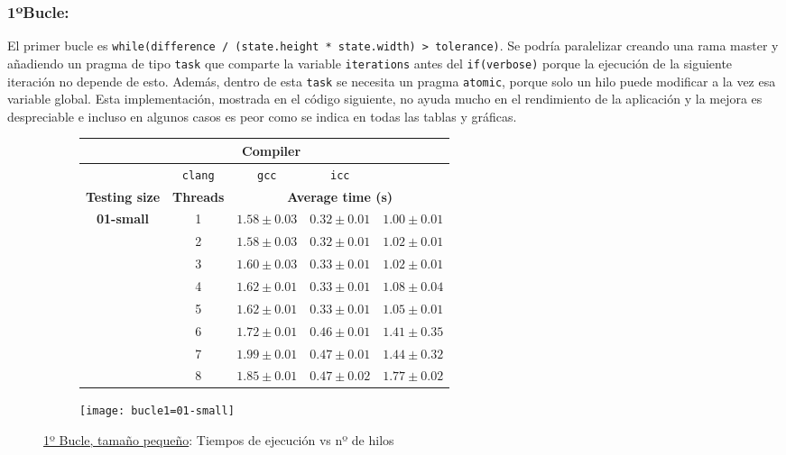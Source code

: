 
\subsubsection{\textbf{1ºBucle:}}
\par El primer bucle es \texttt{while(difference / (state.height * state.width) > tolerance)}. Se podría paralelizar creando una rama master y añadiendo un pragma de tipo
\texttt{task} que comparte la variable \texttt{iterations} antes del \texttt{if(verbose)} porque la ejecución de la siguiente iteración no depende de esto.
Además, dentro de esta \texttt{task} se necesita un pragma \texttt{atomic}, porque solo un hilo puede modificar a la vez esa variable global. Esta
implementación, mostrada en el código siguiente, no ayuda mucho en el rendimiento de la aplicación y la mejora es despreciable e incluso en 
algunos casos es peor como se indica en todas las tablas y gráficas.
\begin{figure}[H]
    \centering
    \begin{subfigure}{0.4\textwidth}
        \begin{adjustbox}{width=\textwidth} 
        \begin{tabular}{|c|c|c|c|c|}
            \hline
            \rowcolor{azul} \multicolumn{2}{|c|}{}&\multicolumn{3}{c|}{\textbf{Compiler}} \\ \hline
            \rowcolor{azul} \multicolumn{2}{|c|}{}&\texttt{clang}&\texttt{gcc}&\texttt{icc}\\ \hline
            \rowcolor{azul} \textbf{Testing size} & \textbf{Threads}&\multicolumn{3}{c|}{\textbf{Average time (s)}} \\ \hline
            \multirow{8}{1cm}{\textbf{01-small}} & 1 & \(1.58\pm{0.03}\) & \(0.32\pm{0.01}\) & \(1.00\pm{0.01}\) \\ \cline{2-5}
            & 2 & \(1.58\pm{0.03}\) & \(0.32\pm{0.01}\) & \(1.02\pm{0.01}\) \\ \cline{2-5}
            & 3 & \(1.60\pm{0.03}\) & \(0.33\pm{0.01}\) & \(1.02\pm{0.01}\) \\ \cline{2-5}
            & 4 & \(1.62\pm{0.01}\) & \(0.33\pm{0.01}\) & \(1.08\pm{0.04}\) \\ \cline{2-5}
            & 5 & \(1.62\pm{0.01}\) & \(0.33\pm{0.01}\) & \(1.05\pm{0.01}\) \\ \cline{2-5}
            & 6 & \(1.72\pm{0.01}\) & \(0.46\pm{0.01}\) & \(1.41\pm{0.35}\) \\ \cline{2-5}
            & 7 & \(1.99\pm{0.01}\) & \(0.47\pm{0.01}\) & \(1.44\pm{0.32}\) \\ \cline{2-5}
            & 8 & \(1.85\pm{0.01}\) & \(0.47\pm{0.02}\) & \(1.77\pm{0.02}\) \\ \hline
        \end{tabular}
        \end{adjustbox}
    \end{subfigure}
    \hfill
    \begin{subfigure}{0.5\textwidth}
        \texttt{[image: bucle1=01-small]}
    \end{subfigure}
    \caption{\underline{1º Bucle, tamaño pequeño}: Tiempos de ejecución vs nº de hilos}
    \label{fig:bucle1=01-small}
\end{figure}
